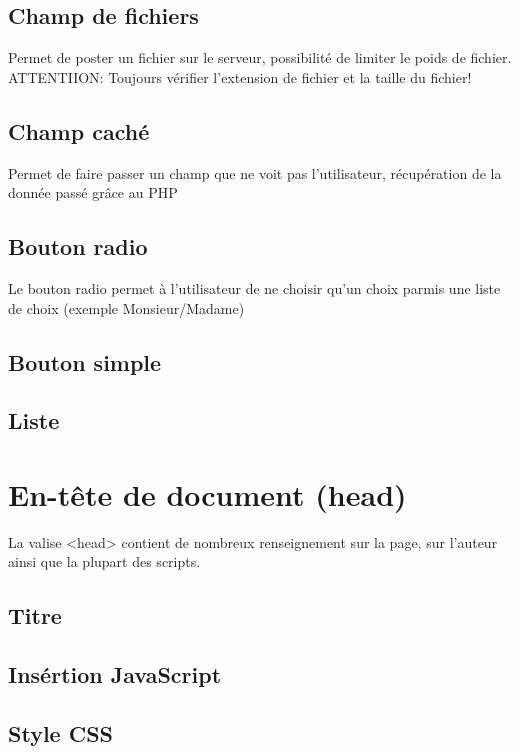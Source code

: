 \documentclass[12pt,a4paper,openany]{article}
\begin{document}
		\subsection{Champ de fichiers}
		Permet de poster un fichier sur le serveur, possibilité de limiter le 
		poids de fichier.\\
		ATTENTIION: Toujours vérifier l'extension de fichier et la taille du fichier!
			
		\subsection{Champ caché}
		Permet de faire passer un champ que ne voit pas l'utilisateur, récupération 
		de la donnée passé grâce au PHP
			
		\subsection{Bouton radio}
		Le bouton radio permet à l'utilisateur de ne choisir qu'un choix parmis 
		une liste de choix (exemple Monsieur/Madame)
			
		\subsection{Bouton simple}
			
		\subsection{Liste}
			

	\section{En-tête de document (head)}
	La valise <head> contient de nombreux renseignement sur la page, sur l'auteur 
	ainsi que la plupart des scripts.
	\subsection{Titre}
			
	\subsection{Insértion JavaScript}
			
	\subsection{Style CSS}	
			
\end{document}
